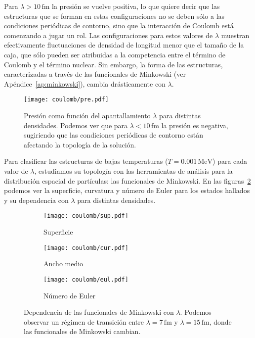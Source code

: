 Para $\lambda>10\,\text{fm}$ la presión se vuelve positiva, lo que quiere decir que las estructuras que se forman en estas configuraciones no se deben sólo a las condiciones periódicas de contorno, sino que la interacción de Coulomb está comenzando a jugar un rol.
Las configuraciones para estos valores de $\lambda$ muestran efectivamente fluctuaciones de densidad de longitud menor que el tamaño de la caja, que sólo pueden ser atribuidas a la competencia entre el término de Coulomb y el término nuclear.
Sin embargo, la forma de las estructuras, caracterizadas a través de las funcionales de Minkowski (ver Apéndice~\ref{ap:minkowski}), cambia drásticamente con $\lambda$.

\begin{figure}[h!]  \centering
\centering
\texttt{[image: coulomb/pre.pdf]}
\caption{Presión como función del apantallamiento $\lambda$ para distintas densidades.
  Podemos ver que para $\lambda<10\,\text{fm}$ la presión es negativa, sugiriendo que las condiciones periódicas de contorno están afectando la topología de la solución.}
\label{fig:pre}
\end{figure}

Para clasificar las estructuras de bajas temperaturas ($T=0.001\,\text{MeV}$) para cada valor de $\lambda$, estudiamos su topología con las herramientas de análisis para la distribución espacial de partículas: las funcionales de Minkowski.
En las figuras~\ref{fig:minkowski} podemos ver la superficie, curvatura y número de Euler para los estados hallados y su dependencia con $\lambda$ para distintas densidades.

\begin{figure}[h!]  %
\centering
\begin{subfigure}[h!]{0.45\columnwidth}
  \centering
  \texttt{[image: coulomb/sup.pdf]}
  \caption{Superficie}
\end{subfigure}
\begin{subfigure}[h!]{0.45\columnwidth}
  \centering
  \texttt{[image: coulomb/cur.pdf]}
  \caption{Ancho medio}
\end{subfigure}
\begin{subfigure}[h!]{0.45\columnwidth}
  \centering
  \texttt{[image: coulomb/eul.pdf]}
  \caption{Número de Euler}
\end{subfigure}
\caption{Dependencia de las funcionales de Minkowski con $\lambda$.
  Podemos observar un régimen de transición entre $\lambda=7\,\text{fm}$ y $\lambda=15\,\text{fm}$, donde las funcionales de Minkowski cambian.}
\label{fig:minkowski}
\end{figure}


